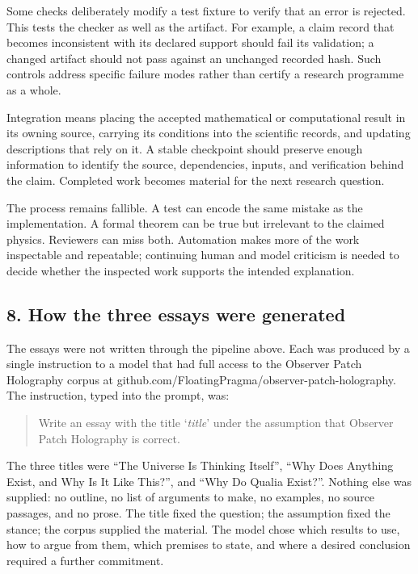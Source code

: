 \documentclass[
  11pt,
]{article}
\begin{document}
Some checks deliberately modify a test fixture to verify that an error
is rejected. This tests the checker as well as the artifact. For
example, a claim record that becomes inconsistent with its declared
support should fail its validation; a changed artifact should not pass
against an unchanged recorded hash. Such controls address specific
failure modes rather than certify a research programme as a whole.

Integration means placing the accepted mathematical or computational
result in its owning source, carrying its conditions into the scientific
records, and updating descriptions that rely on it. A stable checkpoint
should preserve enough information to identify the source, dependencies,
inputs, and verification behind the claim. Completed work becomes
material for the next research question.

The process remains fallible. A test can encode the same mistake as the
implementation. A formal theorem can be true but irrelevant to the
claimed physics. Reviewers can miss both. Automation makes more of the
work inspectable and repeatable; continuing human and model criticism is
needed to decide whether the inspected work supports the intended
explanation.

\subsection{8. How the three essays were
generated}\label{how-the-three-essays-were-generated}

The essays were not written through the pipeline above. Each was
produced by a single instruction to a model that had full access to the
Observer Patch Holography corpus at
github.com/FloatingPragma/observer-patch-holography. The instruction,
typed into the prompt, was:

\begin{quote}
Write an essay with the title `\emph{title}' under the assumption that
Observer Patch Holography is correct.
\end{quote}

The three titles were ``The Universe Is Thinking Itself'', ``Why Does
Anything Exist, and Why Is It Like This?'', and ``Why Do Qualia
Exist?''. Nothing else was supplied: no outline, no list of arguments to
make, no examples, no source passages, and no prose. The title fixed the
question; the assumption fixed the stance; the corpus supplied the
material. The model chose which results to use, how to argue from them,
which premises to state, and where a desired conclusion required a
further commitment.
\end{document}
